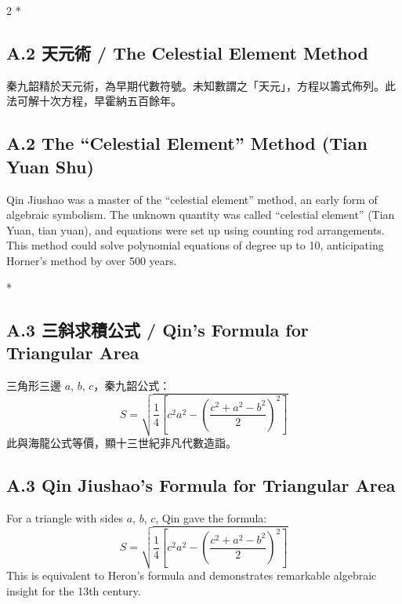 \documentclass[11pt,a4paper]{article}
\begin{document}
\begin{paracol}{2}
\switchcolumn[0]*

\begin{leftcolumn*}
\subsection*{A.2 天元術 / The Celestial Element Method}

秦九韶精於天元術，為早期代數符號。未知數謂之「天元」，方程以籌式佈列。此法可解十次方程，早霍納五百餘年。
\end{leftcolumn*}

\begin{rightcolumn}
\subsection*{A.2 The ``Celestial Element'' Method (Tian Yuan Shu)}

Qin Jiushao was a master of the ``celestial element'' method, an early form 
of algebraic symbolism. The unknown quantity was called ``celestial element'' 
(Tian Yuan, tian yuan), and equations were set up using counting rod arrangements. 
This method could solve polynomial equations of degree up to 10, anticipating 
Horner's method by over 500 years.
\end{rightcolumn}

\switchcolumn[0]*

\begin{leftcolumn*}
\subsection*{A.3 三斜求積公式 / Qin's Formula for Triangular Area}

三角形三邊 $a$, $b$, $c$，秦九韶公式：
\[
S = \sqrt{\frac{1}{4}\left[c^2a^2 - \left(\frac{c^2+a^2-b^2}{2}\right)^2\right]}
\]
此與海龍公式等價，顯十三世紀非凡代數造詣。
\end{leftcolumn*}

\begin{rightcolumn}
\subsection*{A.3 Qin Jiushao's Formula for Triangular Area}

For a triangle with sides $a$, $b$, $c$, Qin gave the formula:
\[
S = \sqrt{\frac{1}{4}\left[c^2a^2 - \left(\frac{c^2+a^2-b^2}{2}\right)^2\right]}
\]
This is equivalent to Heron's formula and demonstrates remarkable algebraic 
insight for the 13th century.
\end{rightcolumn}


\end{paracol}
\end{document}
